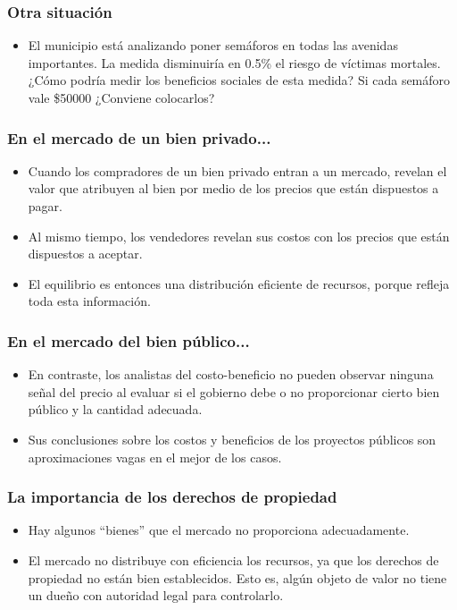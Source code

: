 \documentclass{beamer}
\begin{document}
\begin{frame}
\frametitle{Otra situación}
\begin{itemize}
    \item El municipio está analizando poner semáforos en todas las avenidas importantes. La medida disminuiría en 0.5\% el riesgo de víctimas mortales. ¿Cómo podría medir los beneficios sociales de esta medida? Si cada semáforo vale \$50000 ¿Conviene colocarlos? 
\end{itemize}
\end{frame}



\begin{frame}
\frametitle{En el mercado de un bien privado...}
\begin{itemize}
\item Cuando los compradores de un bien privado entran a un mercado, revelan el valor que atribuyen al bien por medio de los precios que están dispuestos a pagar. 
\item Al mismo tiempo, los vendedores revelan sus costos con los precios que están dispuestos a aceptar. 
\item El equilibrio es entonces una distribución eficiente de recursos, porque refleja toda esta información. 
\end{itemize}
\end{frame}

\begin{frame}
\frametitle{En el mercado del bien público...}
\begin{itemize}
\item En contraste, los analistas del costo-beneficio no pueden observar ninguna señal del precio al evaluar si el gobierno debe o no proporcionar cierto bien público y la cantidad adecuada. 
\item Sus conclusiones sobre los costos y beneficios de los proyectos públicos son aproximaciones vagas en el mejor de los casos.
\end{itemize}
\end{frame}


\begin{frame}
\frametitle{La importancia de los derechos de propiedad}
\begin{itemize}
\item Hay algunos “bienes” que el mercado no proporciona adecuadamente.
\item El mercado no distribuye con eficiencia los recursos, ya que los derechos de propiedad no están bien establecidos. Esto es, algún objeto de valor no tiene un dueño con autoridad legal para controlarlo. 
\end{itemize}
\end{frame}
\end{document}

